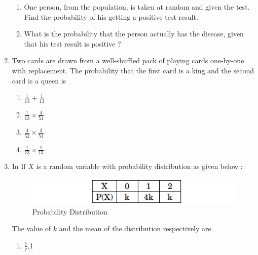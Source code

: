 \begin{enumerate}[label=\thesection.\arabic*.,ref=\thesection.\theenumi]
  \begin{enumerate}[label=(\alph*)]
    
 \item One person, from the population, is taken at random and 
given the test. Find the probability of his getting a 
positive test result.  
 
 \item  What is the probability that the person actually has the 
disease, given that his test result is positive ?

\end{enumerate}

\item Two cards are drawn from a well-shuffled pack of playing 
cards one-by-one with replacement. The probability that the 
first card is a king and the second card is a queen is 

\begin{enumerate}[label=(\alph*)]
    
 \item $\frac{1}{13} + \frac{1}{13}$
 
 \item $\frac{1}{13} \times \frac{4}{51}$

 \item $\frac{4}{52} \times \frac{3}{51}$
 
 \item $\frac{1}{13} \times \frac{1}{13}$ 

\end{enumerate}

\item In  If $X$ is a random variable with probability distribution as given 
below :
\begin{figure}[H]
        \centering
        \includegraphics[width=\columnwidth]{./figs/Screenshot (32).png}
        \caption{Probability Distribution}
        \label{fig:2022/probability/fig5.png}
    \end{figure}

The value of $k$ and the mean of the distribution respectively 
are

 \begin{enumerate}[label=(\alph*)]
    
 \item  $\frac{1}{7}$,1 
 

\end{enumerate}
\end{enumerate}
